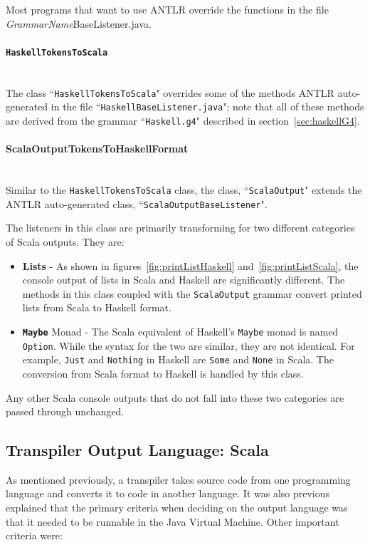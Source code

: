\documentclass{report}
\newcommand{\myparagraph}[1]{\paragraph{#1}\mbox{}\\}
\begin{document}
Most programs that want to use ANTLR override the functions in the file \emph{GrammarName}BaseListener.java.


\myparagraph{\texttt{HaskellTokensToScala}}

The class ``\texttt{HaskellTokensToScala}" overrides some of the methods ANTLR auto-generated in the file ``\texttt{HaskellBaseListener.java}"; note that all of these methods are derived from the grammar ``\texttt{Haskell.g4}" described in section~\ref{sec:haskellG4}.

\myparagraph{ScalaOutputTokensToHaskellFormat}

Similar to the \texttt{HaskellTokensToScala} class, the class, ``\texttt{ScalaOutput}" extends the ANTLR auto-generated class, ``\texttt{ScalaOutputBaseListener}".

The listeners in this class are primarily transforming for two different categories of Scala outputs.  They are:

\begin{itemize}

\item \textbf{Lists} - As shown in figures~\ref{fig:printListHaskell} and~\ref{fig:printListScala}, the console output of lists in Scala and Haskell are significantly different.  The methods in this class coupled with the \texttt{ScalaOutput} grammar convert printed lists from Scala to Haskell format.

\item \textbf{\texttt{Maybe}} Monad - The Scala equivalent of Haskell's \texttt{Maybe} monad is named \texttt{Option}.  While the syntax for the two are similar, they are not identical.  For example, \texttt{Just} and \texttt{Nothing} in Haskell are \texttt{Some} and \texttt{None} in Scala.  The conversion from Scala format to Haskell is handled by this class.

\end{itemize}

Any other Scala console outputs that do not fall into these two categories are passed through unchanged.


\subsection{Transpiler Output Language: Scala}

As mentioned previously, a transpiler takes source code from one programming language and converts it to code in another language.  It was also previous explained that the primary criteria when deciding on the output language was that it needed to be runnable in the Java Virtual Machine.  Other important criteria were:
\end{document}

